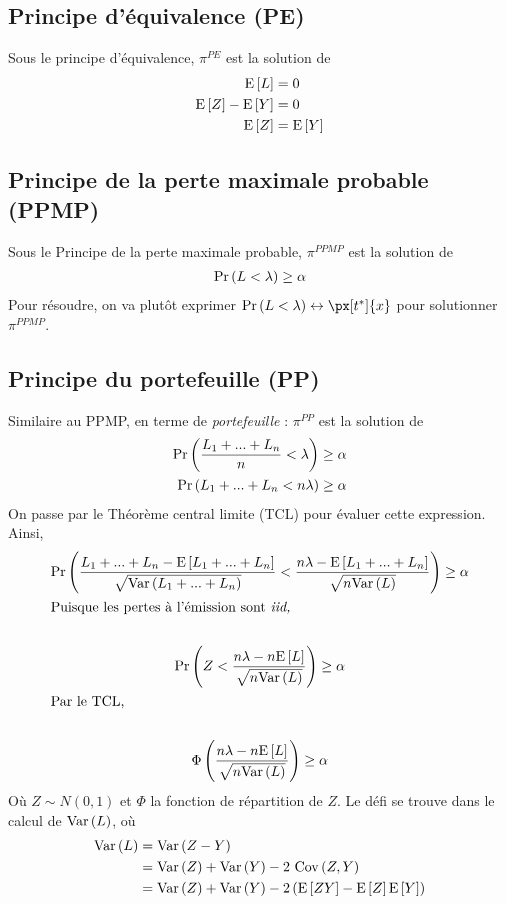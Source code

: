 \documentclass[10pt, french]{article}
\begin{document}
\begin{multicols*}{3}
\subsection{Principe d'équivalence (PE)}
Sous le principe d'équivalence, $\pi^{PE}$ est la solution de
\begin{align*}
\mathrm{E} \left[ L \right]	& = 0 \\
\mathrm{E} \left[ Z \right] - \mathrm{E} \left[ Y \right]	& = 0 \\
\mathrm{E} \left[ Z \right] & = \mathrm{E} \left[ Y \right] \\
\end{align*}


\subsection{Principe de la perte maximale probable (PPMP)}
Sous le Principe de la perte maximale probable, $\pi^{PPMP}$ est la solution de
\begin{align*}
\Pr \left( L < \lambda \right) \geq \alpha
\end{align*}
Pour résoudre, on va plutôt exprimer $\prob{L < \lambda} \leftrightarrow \px[t^*]{x}$ pour solutionner $\pi^{PPMP}$.


\subsection{Principe du portefeuille (PP)}
Similaire au PPMP, en terme de \emph{portefeuille} : $\pi^{PP}$ est la solution de
\begin{align*}
\Pr \left( \frac{L_1 + ... + L_n}{n} < \lambda \right) &  \geq \alpha \\
\Pr \left( L_1 + ... + L_n < n \lambda \right) & \geq \alpha \\
\end{align*}
On passe par le Théorème central limite (TCL) pour évaluer cette expression. Ainsi,
\begin{gather*}
\Pr \left( \frac{L_1 + ... + L_n - \mathrm{E} \left[ L_1 + ... + L_n \right]}{\sqrt{\mathrm{Var} \left( L_1 + ... + L_n \right)}} < \frac{n \lambda - \mathrm{E} \left[ L_1 + ... + L_n \right]}{\sqrt{n \mathrm{Var} \left( L \right)}}   \right)  \geq \alpha \\
\shortintertext{Puisque les pertes à l'émission sont \emph{iid,}} \\
\Pr \left( Z < \frac{n \lambda - n \mathrm{E} \left[ L \right]}{\sqrt{n \mathrm{Var} \left( L \right)}} \right)  \geq \alpha \\
\shortintertext{Par le TCL,} \\
\Phi \left( \frac{n \lambda - n \mathrm{E} \left[ L \right]}{\sqrt{n \mathrm{Var} \left( L \right)}} \right)  \geq \alpha \\
\end{gather*}
Où $Z \sim N(0,1)$ et $\Phi$ la fonction de répartition de $Z$. Le défi se trouve dans le calcul de $\mathrm{Var} \left( L \right)$, où
\begin{align*}
\mathrm{Var} \left( L \right)	& = \mathrm{Var} \left( Z - Y \right) \\
& = \mathrm{Var} \left( Z \right) + \mathrm{Var} \left( Y \right) - 2 \  \mathrm{Cov} \left( Z, Y \right) \\
& = \mathrm{Var} \left( Z \right)  + \mathrm{Var} \left( Y \right) - 2 \left( \mathrm{E} \left[ ZY \right] - \mathrm{E} \left[ Z \right] \mathrm{E} \left[ Y \right] \right) \\
\end{align*}


\end{multicols*}
\end{document}
